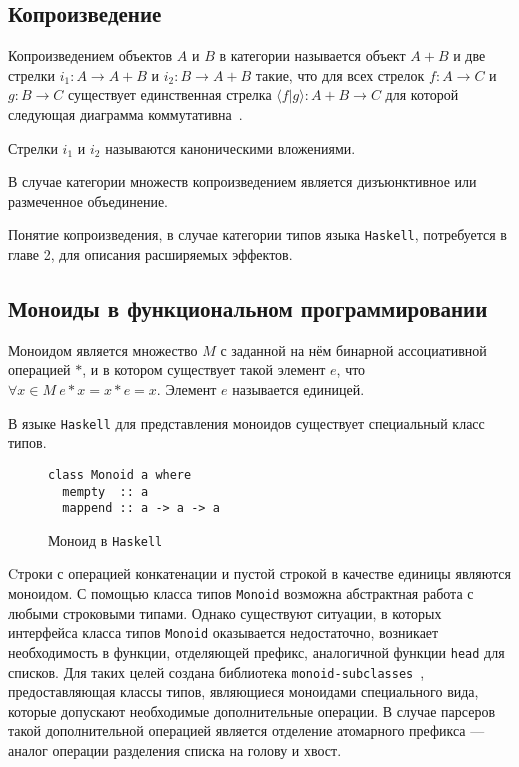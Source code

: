 \subsection{Копроизведение}

Копроизведением объектов $A$ и $B$ в категории называется объект $A + B$ и две
стрелки $i_1 : A \to A + B$ и $i_2 : B \to A + B$ такие, что для всех стрелок
$f : A \to C$ и $g : B \to C$ существует единственная стрелка 
$\langle f|g\rangle  : A + B \to C$ для которой следующая диаграмма 
коммутативна~\cite{TeorCat}.

\begin{center}
\end{center}

Стрелки $i_1$ и $i_2$ называются каноническими вложениями.

В случае категории множеств копроизведением является дизъюнктивное 
или размеченное объединение.  

Понятие копроизведения, в случае категории типов языка \lstinline{Haskell}, 
потребуется в главе 2, для описания расширяемых эффектов.

\subsection{Моноиды в функциональном программировании}

Моноидом является множество $M$ с заданной на нём бинарной ассоциативной 
операцией $*$, и в котором существует такой элемент 
$e$, что $\forall x \in M~e*x = x*e = x$. Элемент $e$ называется единицей.

В языке \lstinline{Haskell} для представления моноидов существует специальный 
класс типов.

\begin{figure}[h]
\begin{lstlisting}
class Monoid a where
  mempty  :: a
  mappend :: a -> a -> a
\end{lstlisting}
\caption{Моноид в \lstinline{Haskell}}
\label{listing:Monoid}
\end{figure}

Cтроки с операцией конкатенации и пустой строкой в качестве единицы являются 
моноидом. С помощью класса типов \lstinline{Monoid} возможна абстрактная работа 
с любыми строковыми типами. Однако существуют ситуации, в которых интерфейса 
класса типов \lstinline{Monoid} оказывается недостаточно, возникает 
необходимость в функции, отделяющей префикс, аналогичной функции 
\lstinline{head} для списков. Для таких целей создана библиотека 
\lstinline{monoid-subclasses}~\cite{monoids}, предоставляющая 
классы типов, являющиеся моноидами специального вида, которые допускают 
необходимые дополнительные операции. В случае парсеров такой дополнительной 
операцией является отделение атомарного префикса --- аналог операции разделения 
списка на голову и хвост.

